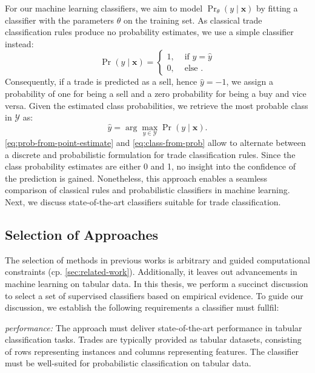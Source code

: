 For our machine learning classifiers, we aim to model $\Pr_{\theta}(y \mid \mathbf{x})$ by fitting a classifier with the parameters $\theta$ on the training set. As classical trade classification rules produce no probability estimates, we use a simple classifier instead:
\begin{equation}
    \operatorname{Pr}(y\mid \mathbf{x})= \begin{cases}1, & \text { if } y=\hat{y} \\ 0, & \text { else }.\end{cases}
    \label{eq:prob-from-point-estimate}
\end{equation}
Consequently, if a trade is predicted as a sell, hence $\hat{y} = -1$, we assign a probability of one for being a sell and a zero probability for being a buy and vice versa. Given the estimated class probabilities, we retrieve the most probable class in $\mathcal{Y}$ as:
\begin{equation}
    \hat{y}=\arg\max_{y \in \mathcal{Y}} \operatorname{Pr}(y \mid \mathbf{x}).
    \label{eq:class-from-prob}
\end{equation}
\cref{eq:prob-from-point-estimate} and \cref{eq:class-from-prob} allow to alternate between a discrete and probabilistic formulation for trade classification rules. Since the class probability estimates are either 0
and 1, no insight into the confidence of the prediction is gained. Nonetheless, this approach enables a seamless comparison of classical rules and probabilistic classifiers in machine learning. Next, we discuss state-of-the-art classifiers suitable for trade classification.

\subsection{Selection of Approaches}\label{sec:selection-of-approaches}

The selection of methods in previous works is arbitrary and guided computational constraints (cp. \cref{sec:related-work}). Additionally, it leaves out advancements in machine learning on tabular data.
In this thesis, we perform a succinct discussion to select a set of supervised classifiers based on empirical evidence. To guide our discussion, we establish the following requirements a classifier must fullfil:

\emph{performance:} The approach must deliver state-of-the-art performance in tabular classification tasks. Trades are typically provided as tabular datasets, consisting of rows representing instances and columns representing features. The classifier must be well-suited for probabilistic classification on tabular data.

